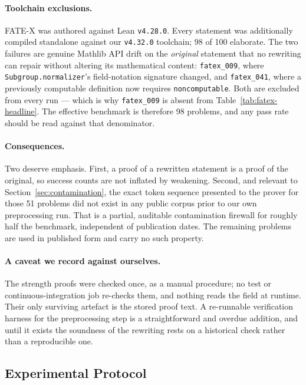 \documentclass[12pt, a4paper]{article}
\begin{document}
\paragraph{Toolchain exclusions.} FATE-X was authored against Lean
\texttt{v4.28.0}. Every statement was additionally compiled standalone
against our \texttt{v4.32.0} toolchain; 98 of 100 elaborate. The two
failures are genuine Mathlib API drift on the \emph{original} statement that
no rewriting can repair without altering its mathematical content:
\texttt{fatex\_009}, where \texttt{Subgroup.normalizer}'s field-notation
signature changed, and \texttt{fatex\_041}, where a previously computable
definition now requires \texttt{noncomputable}. Both are excluded from every
run --- which is why \texttt{fatex\_009} is absent from
Table~\ref{tab:fatex-headline}. The effective benchmark is therefore 98
problems, and any pass rate should be read against that denominator.

\paragraph{Consequences.} Two deserve emphasis. First, a proof of a
rewritten statement is a proof of the original, so success counts are not
inflated by weakening. Second, and relevant to
Section~\ref{sec:contamination}, the exact token sequence presented to the
prover for those 51 problems did not exist in any public corpus prior to our
own preprocessing run. That is a partial, auditable contamination firewall
for roughly half the benchmark, independent of publication dates. The
remaining problems are used in published form and carry no such property.

\paragraph{A caveat we record against ourselves.} The strength proofs were
checked once, as a manual procedure; no test or continuous-integration job
re-checks them, and nothing reads the field at runtime. Their only surviving
artefact is the stored proof text. A re-runnable verification harness for
the preprocessing step is a straightforward and overdue addition, and until
it exists the soundness of the rewriting rests on a historical check rather
than a reproducible one.

\subsection{Experimental Protocol}
\label{sec:protocol}
\end{document}
